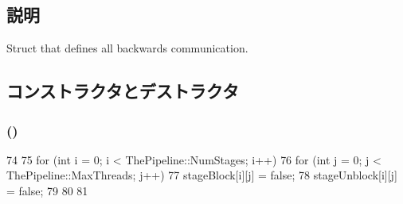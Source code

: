 \subsection{説明}
Struct that defines all backwards communication. 

\subsection{コンストラクタとデストラクタ}
\hypertarget{structTimeStruct_ac60509ddefb1896ba472e03709928dda}{
\subsubsection[{TimeStruct}]{ ()}}
\label{structTimeStruct_ac60509ddefb1896ba472e03709928dda}



\begin{DoxyCode}
74     {
75         for (int i = 0; i < ThePipeline::NumStages; i++) {
76             for (int j = 0; j < ThePipeline::MaxThreads; j++) {
77                 stageBlock[i][j] = false;
78                 stageUnblock[i][j] = false;
79             }
80         }
81     }
\end{DoxyCode}


